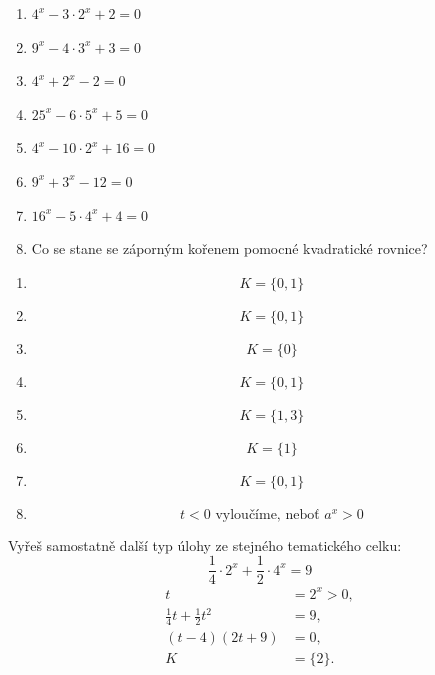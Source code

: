 \documentclass[11pt,a4paper]{article}
\begin{document}
\begin{zadaniReseniBox}[title={Samostatná práce 1}]
\begin{enumerate}[label=\alph*)]
\item $4^x-3\cdot2^x+2=0$
\item $9^x-4\cdot3^x+3=0$
\item $4^x+2^x-2=0$
\item $25^x-6\cdot5^x+5=0$
\item $4^x-10\cdot2^x+16=0$
\item $9^x+3^x-12=0$
\item $16^x-5\cdot4^x+4=0$
\item Co se stane se záporným kořenem pomocné kvadratické rovnice?
\end{enumerate}
\tcblower
\begin{enumerate}[label=\alph*)]
\item \[
K=\{0,1\}
\]
\item \[
K=\{0,1\}
\]
\item \[
K=\{0\}
\]
\item \[
K=\{0,1\}
\]
\item \[
K=\{1,3\}
\]
\item \[
K=\{1\}
\]
\item \[
K=\{0,1\}
\]
\item \[
t<0\text{ vyloučíme, neboť }a^x>0
\]
\end{enumerate}
\end{zadaniReseniBox}
\begin{zadaniReseniBox}[title={Samostatná práce 2}]
Vyřeš samostatně další typ úlohy ze stejného tematického celku:
\[
\displaystyle\frac{1}{4}\cdot2^x+\frac{1}{2}\cdot4^x=9
\]
\tcblower
\[\begin{aligned}t&=2^x>0,\\\frac{1}{4}t+\frac{1}{2}t^2&=9,\\(t-4)(2t+9)&=0,\\K&=\{2\}.\end{aligned}\]
\end{zadaniReseniBox}
\end{document}
